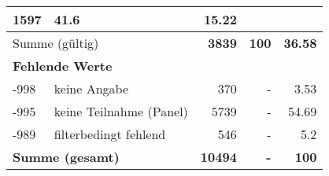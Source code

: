 \begin{longtable}{lXrrr}
       \num{1597} &
       \num[round-mode=places,round-precision=2]{41.6} &
         \num[round-mode=places,round-precision=2]{15.22} \\
     \midrule
     \multicolumn{2}{l}{Summe (gültig)} &
       \textbf{\num{3839}} &
     \textbf{\num{100}} &
       \textbf{\num[round-mode=places,round-precision=2]{36.58}} \\
     \multicolumn{5}{l}{\textbf{Fehlende Werte}}\\
       -998 &
       keine Angabe &
         \num{370} &
        - &
         \num[round-mode=places,round-precision=2]{3.53} \\
       -995 &
       keine Teilnahme (Panel) &
         \num{5739} &
        - &
         \num[round-mode=places,round-precision=2]{54.69} \\
       -989 &
       filterbedingt fehlend &
         \num{546} &
        - &
         \num[round-mode=places,round-precision=2]{5.2} \\
     \midrule
     \multicolumn{2}{l}{\textbf{Summe (gesamt)}} &
          \textbf{\num{10494}} &
        \textbf{-} &
        \textbf{\num{100}} \\
     \bottomrule
     \end{longtable}
     
